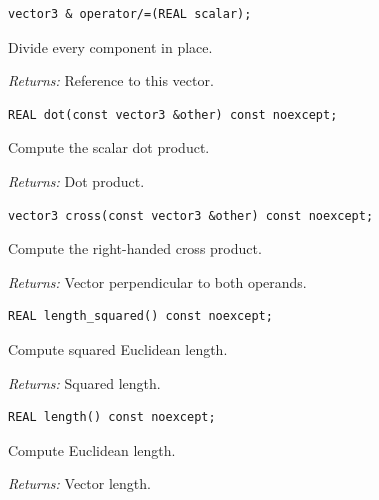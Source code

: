 \par\noindent\begin{minipage}{\linewidth}
\begin{lstlisting}[style=apireference]
vector3 & operator/=(REAL scalar);
\end{lstlisting}
{\footnotesize Divide every component in place.\par}
{\footnotesize\textit{Returns:} Reference to this vector.\par}
\end{minipage}\par\vspace{1pt}
\par\noindent\begin{minipage}{\linewidth}
\begin{lstlisting}[style=apireference]
REAL dot(const vector3 &other) const noexcept;
\end{lstlisting}
{\footnotesize Compute the scalar dot product.\par}
{\footnotesize\textit{Returns:} Dot product.\par}
\end{minipage}\par\vspace{1pt}
\par\noindent\begin{minipage}{\linewidth}
\begin{lstlisting}[style=apireference]
vector3 cross(const vector3 &other) const noexcept;
\end{lstlisting}
{\footnotesize Compute the right-handed cross product.\par}
{\footnotesize\textit{Returns:} Vector perpendicular to both operands.\par}
\end{minipage}\par\vspace{1pt}
\par\noindent\begin{minipage}{\linewidth}
\begin{lstlisting}[style=apireference]
REAL length_squared() const noexcept;
\end{lstlisting}
{\footnotesize Compute squared Euclidean length.\par}
{\footnotesize\textit{Returns:} Squared length.\par}
\end{minipage}\par\vspace{1pt}
\par\noindent\begin{minipage}{\linewidth}
\begin{lstlisting}[style=apireference]
REAL length() const noexcept;
\end{lstlisting}
{\footnotesize Compute Euclidean length.\par}
{\footnotesize\textit{Returns:} Vector length.\par}
\end{minipage}\par\vspace{1pt}
